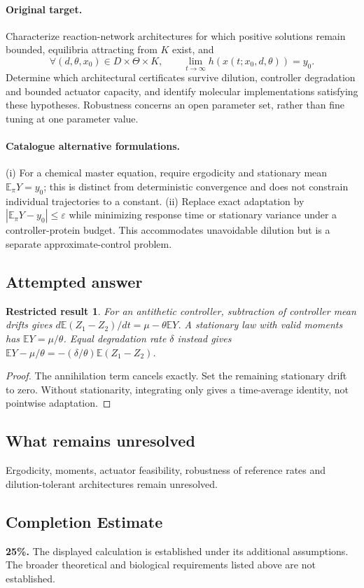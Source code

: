 \documentclass[11pt]{article}
\newcommand{\E}{\mathbb E}
\providecommand{\E}{\mathbb E}
\newtheorem{attemptresult}{Restricted result}[section]
\begin{document}
\paragraph{Original target.}
Characterize reaction-network architectures for which positive solutions remain bounded, equilibria attracting from $K$ exist, and
\[\forall(d,\theta,x_0)\in D\times\Theta\times K,\qquad \lim_{t\to\infty}h(x(t;x_0,d,\theta))=y_0.\]
Determine which architectural certificates survive dilution, controller degradation and bounded actuator capacity, and identify molecular implementations satisfying these hypotheses. Robustness concerns an open parameter set, rather than fine tuning at one parameter value.
\paragraph{Catalogue alternative formulations.}
(i) For a chemical master equation, require ergodicity and stationary mean $\E_\pi Y=y_0$; this is distinct from deterministic convergence and does not constrain individual trajectories to a constant. (ii) Replace exact adaptation by $|\E_\pi Y-y_0|\le\varepsilon$ while minimizing response time or stationary variance under a controller-protein budget. This accommodates unavoidable dilution but is a separate approximate-control problem.
\subsection{Attempted answer}
\begin{attemptresult}
For an antithetic controller, subtraction of controller mean drifts gives $d\E(Z_1-Z_2)/dt=\mu-\theta\E Y$. A stationary law with valid moments has $\E Y=\mu/\theta$. Equal degradation rate $\delta$ instead gives $\E Y-\mu/\theta=-(\delta/\theta)\E(Z_1-Z_2)$.
\end{attemptresult}
\begin{proof}
The annihilation term cancels exactly. Set the remaining stationary drift to zero. Without stationarity, integrating only gives a time-average identity, not pointwise adaptation.
\end{proof}
\subsection{What remains unresolved}
Ergodicity, moments, actuator feasibility, robustness of reference rates and dilution-tolerant architectures remain unresolved.
\subsection{Completion Estimate}
\textbf{25\%.} The displayed calculation is established under its additional assumptions. The broader theoretical and biological requirements listed above are not established.
\end{document}
